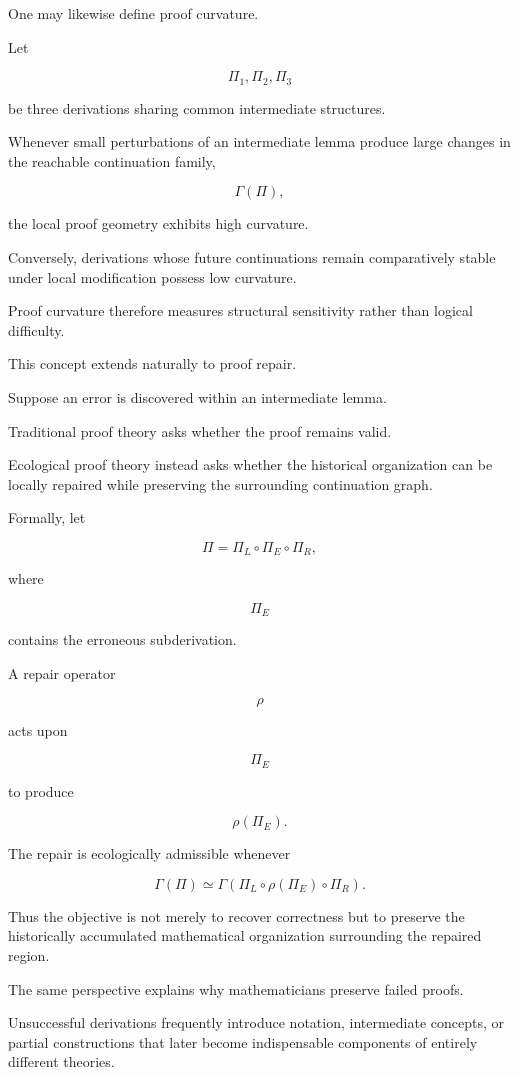 \documentclass[12pt,oneside]{article}
\theoremstyle{remark}
\begin{document}
One may likewise define proof curvature.

Let

\[
\Pi_1,
\Pi_2,
\Pi_3
\]

be three derivations sharing common intermediate structures.

Whenever small perturbations of an intermediate lemma produce large changes in
the reachable continuation family,

\[
\Gamma(\Pi),
\]

the local proof geometry exhibits high curvature.

Conversely, derivations whose future continuations remain comparatively stable
under local modification possess low curvature.

Proof curvature therefore measures structural sensitivity rather than logical
difficulty.

This concept extends naturally to proof repair.

Suppose an error is discovered within an intermediate lemma.

Traditional proof theory asks whether the proof remains valid.

Ecological proof theory instead asks whether the historical organization can be
locally repaired while preserving the surrounding continuation graph.

Formally, let

\[
\Pi
=
\Pi_L
\circ
\Pi_E
\circ
\Pi_R,
\]

where

\[
\Pi_E
\]

contains the erroneous subderivation.

A repair operator

\[
\rho
\]

acts upon

\[
\Pi_E
\]

to produce

\[
\rho(\Pi_E).
\]

The repair is ecologically admissible whenever

\[
\Gamma(\Pi)
\simeq
\Gamma
\left(
\Pi_L
\circ
\rho(\Pi_E)
\circ
\Pi_R
\right).
\]

Thus the objective is not merely to recover correctness but to preserve the
historically accumulated mathematical organization surrounding the repaired
region.

The same perspective explains why mathematicians preserve failed proofs.

Unsuccessful derivations frequently introduce notation, intermediate concepts,
or partial constructions that later become indispensable components of entirely
different theories.
\end{document}
